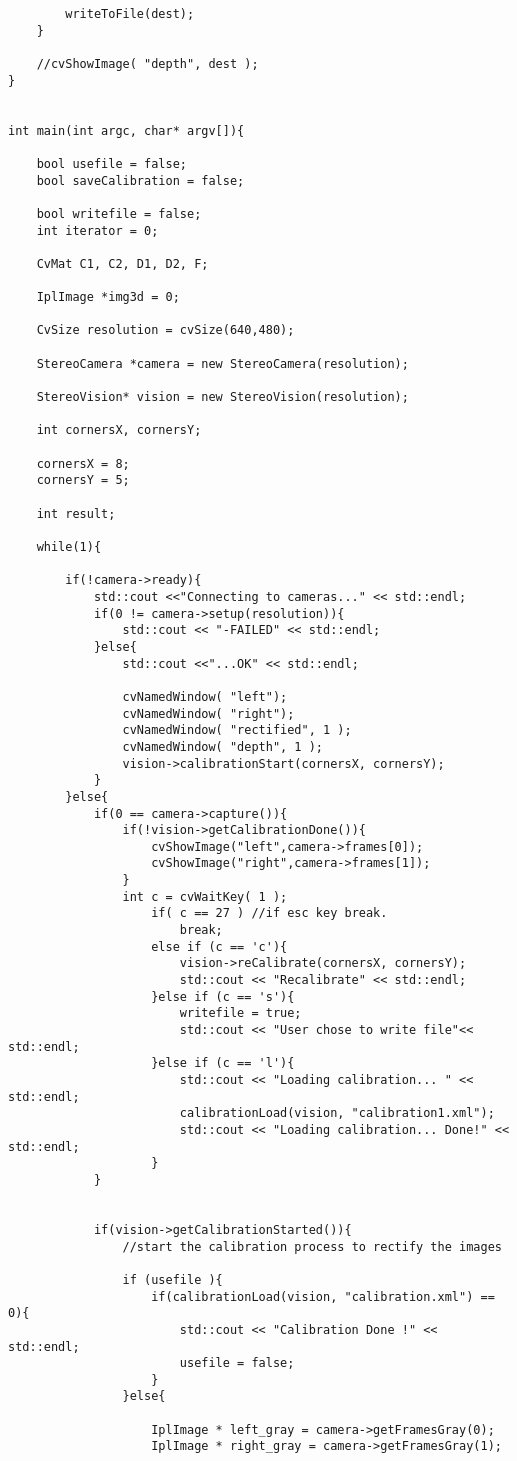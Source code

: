 \begin{lstlisting}
		writeToFile(dest);
	}

	//cvShowImage( "depth", dest );
}


int main(int argc, char* argv[]){

	bool usefile = false;
	bool saveCalibration = false;

	bool writefile = false;
	int iterator = 0;

	CvMat C1, C2, D1, D2, F;

	IplImage *img3d = 0;

	CvSize resolution = cvSize(640,480);

	StereoCamera *camera = new StereoCamera(resolution);

    StereoVision* vision = new StereoVision(resolution);

	int cornersX, cornersY;

	cornersX = 8;
	cornersY = 5;

	int result;

	while(1){

		if(!camera->ready){
			std::cout <<"Connecting to cameras..." << std::endl;
			if(0 != camera->setup(resolution)){
				std::cout << "-FAILED" << std::endl;
			}else{
				std::cout <<"...OK" << std::endl;

				cvNamedWindow( "left");
				cvNamedWindow( "right");
				cvNamedWindow( "rectified", 1 );
				cvNamedWindow( "depth", 1 );
				vision->calibrationStart(cornersX, cornersY);
			}
		}else{
			if(0 == camera->capture()){
				if(!vision->getCalibrationDone()){
					cvShowImage("left",camera->frames[0]);
					cvShowImage("right",camera->frames[1]);
				}
				int c = cvWaitKey( 1 );
					if( c == 27 ) //if esc key break.
						break;
					else if (c == 'c'){
						vision->reCalibrate(cornersX, cornersY);
						std::cout << "Recalibrate" << std::endl;
					}else if (c == 's'){
						writefile = true;
						std::cout << "User chose to write file"<< std::endl;
					}else if (c == 'l'){
						std::cout << "Loading calibration... " << std::endl;
						calibrationLoad(vision, "calibration1.xml");
						std::cout << "Loading calibration... Done!" << std::endl;
					}
			}


			if(vision->getCalibrationStarted()){
                //start the calibration process to rectify the images

				if (usefile ){
					if(calibrationLoad(vision, "calibration.xml") == 0){
						std::cout << "Calibration Done !" << std::endl;
						usefile = false;
					}
				}else{

					IplImage * left_gray = camera->getFramesGray(0);
					IplImage * right_gray = camera->getFramesGray(1);


\end{lstlisting}
